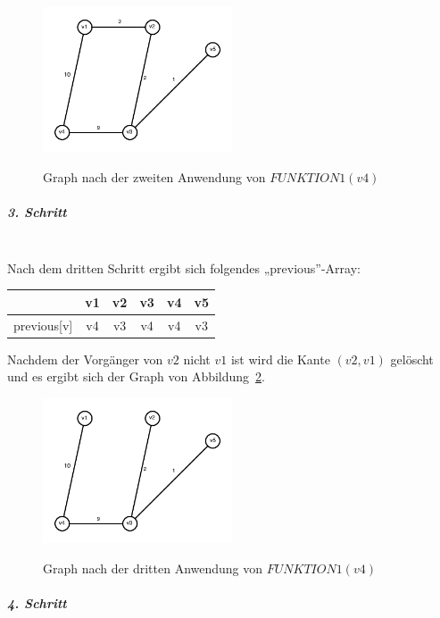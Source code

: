 \documentclass[a4paper, 12pt]{article}
\begin{document}
\begin{figure}[htbp]
	\caption{Graph nach der zweiten Anwendung von $FUNKTION1(v4)$}
	\vskip 0.2cm
	\centering
	\includegraphics[width=0.5\textwidth]{Figures/Test_2011-01-14-3A_Step2}
	\label{figure:Test_2011-01-14-3A_Step2}
\end{figure}

\subparagraph{3. Schritt}~\\

Nach dem dritten Schritt ergibt sich folgendes „previous”-Array:

\begin{center}
	\begin{tabular}{lccccc}
					& v1	& v2	& v3	& v4	& v5\\
		\hline
		previous[v] & v4	& v3	& v4	& v4	& v3\\
	\end{tabular}
\end{center}

Nachdem der Vorgänger von $v2$ nicht $v1$ ist wird die Kante $(v2,v1)$ gelöscht und es ergibt sich der Graph von Abbildung~\ref{figure:Test_2011-01-14-3A_Step3}.

\begin{figure}[htbp]
	\caption{Graph nach der dritten Anwendung von $FUNKTION1(v4)$}
	\vskip 0.2cm
	\centering
	\includegraphics[width=0.5\textwidth]{Figures/Test_2011-01-14-3A_Step3}
	\label{figure:Test_2011-01-14-3A_Step3}
\end{figure}

\subparagraph{4. Schritt}~\\
\end{document}
